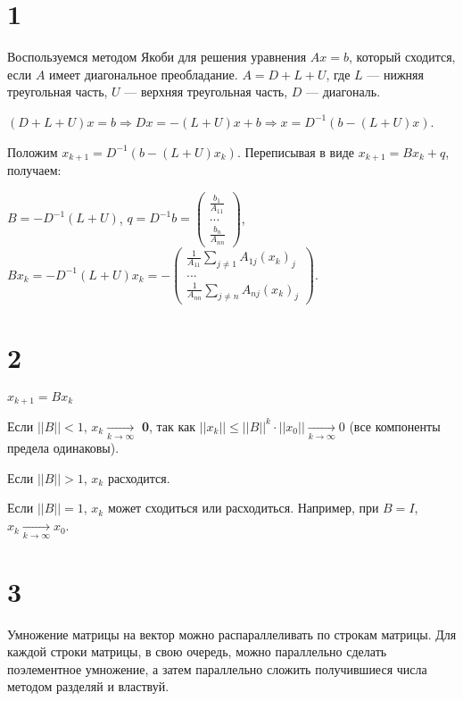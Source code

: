\documentclass[12pt,a4paper]{article}
\begin{document}
\section*{1}
Воспользуемся методом Якоби для решения уравнения $Ax=b$, который сходится, если $A$ имеет диагональное преобладание. $A=D+L+U$, где $L$ --- нижняя треугольная часть, $U$ --- верхняя треугольная часть, $D$ --- диагональ. 

$(D+L+U)x=b \Rightarrow Dx=-(L+U)x+b \Rightarrow x=D^{-1}(b-(L+U)x)$. 

Положим $x_{k+1}=D^{-1}(b-(L+U)x_k)$. Переписывая в виде $x_{k+1}=Bx_k+q$, получаем:

$B=-D^{-1}(L+U)$, 
$q=D^{-1}b=\begin{pmatrix}
    \frac{b_1}{A_{11}} \\
    ...\\
    \frac{b_n}{A_{nn}}
\end{pmatrix}$,
$Bx_k=-D^{-1}(L+U)x_k=-\begin{pmatrix}
    \frac{1}{A_{11}}\sum\limits_{j\not=1} A_{1j}(x_k)_j \\
    ... \\
    \frac{1}{A_{nn}}\sum\limits_{j\not=n} A_{nj}(x_k)_j
\end{pmatrix}$.

\section*{2}
$x_{k+1}=Bx_k$

Если $||B||<1$, $x_k \xrightarrow[k \to \infty]{}$ \textbf{0}, так как $||x_k||\leq ||B||^k\cdot ||x_0|| \xrightarrow[k \to \infty]{} 0$ (все компоненты предела одинаковы).

Если $||B||>1$, $x_k$ расходится.

Если $||B||=1$, $x_k$ может сходиться или расходиться. Например, при $B=I$, $x_k \xrightarrow[k \to \infty]{} x_0$.

\section*{3}
Умножение матрицы на вектор можно распараллеливать по строкам матрицы. Для каждой строки матрицы, в свою очередь, можно параллельно сделать поэлементное умножение, а затем параллельно сложить получившиеся числа методом разделяй и властвуй.
\end{document}
